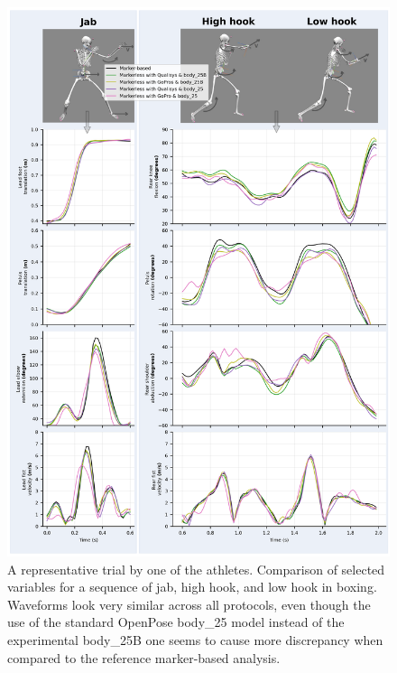 \begin{figure}[!ht]
	\centering
	\def\svgwidth{1\columnwidth}
	\fontsize{10pt}{10pt}\selectfont
	\includegraphics[width=1\linewidth]{"../Chap6/Figures/Fig_GraphKPI.png"}
	\caption{A representative trial by one of the athletes. Comparison of selected variables for a sequence of jab, high hook, and low hook in boxing. Waveforms look very similar across all protocols, even though the use of the standard OpenPose body\_25 model instead of the experimental body\_25B one seems to cause more discrepancy when compared to the reference marker-based analysis.}
	\label{fig_graphkpi}
\end{figure}

